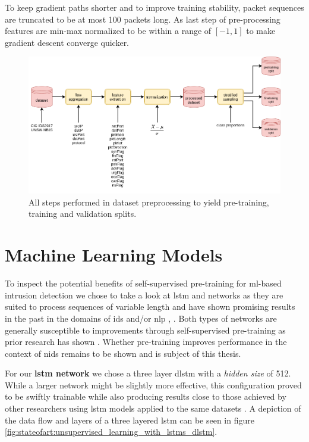 To keep gradient paths shorter and to improve training stability, packet sequences are truncated to be at most 100 packets long. As last step of pre-processing features are min-max normalized to be within a range of $[-1,1]$ to make gradient descent converge quicker. \par

\begin{figure}[h]
	\centering
	\includegraphics[width=0.95\linewidth]{graphics/img/dataset_preprocessing.png}
	\caption{All steps performed in dataset preprocessing to yield pre-training, training and validation splits.}
	\label{fig:dataset_preprocessing}
\end{figure}

\section{Machine Learning Models}

To inspect the potential benefits of self-supervised pre-training for \gls{ml}-based intrusion detection we chose to take a look at \gls{lstm} and networks as they are suited to process sequences of variable length and have shown promising results in the past in the domains of \gls{ids} and/or \gls{nlp} \cite{bert}, \cite{attention_model_ids}. Both types of networks are generally susceptible to improvements through self-supervised pre-training as prior research has shown \cite{bert} \cite{unsupervised_learning_lstms} \cite{unsupervised_learning_lstms_timeseries}. Whether pre-training improves performance in the context of \gls{nids} remains to be shown and is subject of this thesis.

For our \textbf{\gls{lstm} network} we chose a three layer \gls{dlstm} with a \textit{hidden size} of 512. While a larger network might be slightly more effective, this configuration proved to be swiftly trainable while also producing results close to those achieved by other researchers using \gls{lstm} models applied to the same datasets \cite{fog_based_detection_survey_2020}. A depiction of the data flow and layers of a three layered \gls{lstm} can be seen in figure \ref{fig:stateofart:unsupervised_learning_with_lstms_dlstm}. \par


